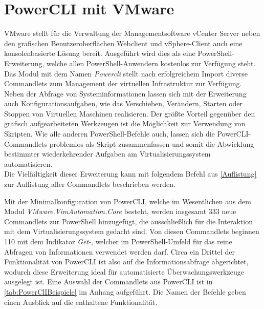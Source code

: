 \section{PowerCLI mit VMware}\label{sec:PowerCLI}
VMware stellt für die Verwaltung der Managementsoftware vCenter Server neben den grafischen Benutzeroberflächen Webclient und vSphere-Client auch eine konsolenbasierte Lösung bereit. Ausgeführt wird dies als eine PowerShell-Erweiterung, welche allen PowerShell-Anwendern kostenlos zur Verfügung steht. Das Modul mit dem Namen \textit{Power\acrshort{cli}} stellt nach erfolgreichem Import diverse Commandlets zum Management der virtuellen Infrastruktur zur Verfügung. Neben der Abfrage von Systeminformationen lassen sich mit der Erweiterung auch Konfigurationsaufgaben, wie das Verschieben, Verändern, Starten oder Stoppen von Virtuellen Maschinen realisieren. Der größte Vorteil gegenüber den grafisch aufgearbeiteten Werkzeugen ist die Möglichkeit zur Verwendung von Skripten. Wie alle anderen PowerShell-Befehle auch, lassen sich die PowerCLI-Commandlets problemlos als Skript zusammenfassen und somit die Abwicklung bestimmter wiederkehrender Aufgaben am Virtualisierungssystem automatisieren.~\cite[S.~324 f.]{ThomasJoos2018}\medskip\\
Die Vielfältigkeit dieser Erweiterung kann mit folgendem Befehl aus \autoref{Auflistung} zur Auflistung aller Commandlets beschrieben werden.

Mit der Minimalkonfiguration von PowerCLI, welche im Wesentlichen aus dem Modul \textit{VMware.VimAutomation.Core} besteht, werden insgesamt 333 neue Commandlets zur PowerShell hinzugefügt, die ausschließlich für die Interaktion mit dem Virtualisierungssystem gedacht sind. Von diesen Commandlets beginnen 110 mit dem Indikator \textit{Get-}, welcher im PowerShell-Umfeld für das reine Abfragen von Informationen verwendet werden darf. Circa ein Drittel der Funktionalität von PowerCLI ist also auf die Informationsabfrage abgerichtet, wodurch diese Erweiterung ideal für automatisierte Überwachungswerkzeuge ausgelegt ist. Eine Auswahl der Commandlets aus PowerCLI ist in \autoref{tab:PowerClIBeispiele} im Anhang aufgeführt. Die Namen der Befehle geben einen Ausblick auf die enthaltene Funktionalität.

